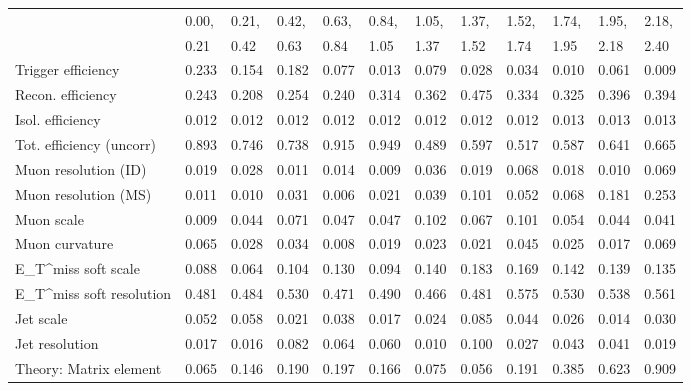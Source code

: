 \begin{tabular}{l|p{0.6cm}p{0.6cm}p{0.6cm}p{0.6cm}p{0.6cm}p{0.6cm}p{0.6cm}p{0.6cm}p{0.6cm}p{0.6cm}p{0.6cm}}
\hline
   & 0.00, & 0.21, & 0.42, & 0.63, & 0.84, & 1.05, & 1.37, & 1.52, & 1.74, & 1.95, & 2.18,  \\ 
   & 0.21 & 0.42 & 0.63 & 0.84 & 1.05 & 1.37 & 1.52 & 1.74 & 1.95 & 2.18 & 2.40  \\ 
\hline
Trigger efficiency                       & 0.233 & 0.154 & 0.182 & 0.077 & 0.013 & 0.079 & 0.028 & 0.034 & 0.010 & 0.061 & 0.009 \\
Recon. efficiency                        & 0.243 & 0.208 & 0.254 & 0.240 & 0.314 & 0.362 & 0.475 & 0.334 & 0.325 & 0.396 & 0.394 \\
Isol. efficiency                         & 0.012 & 0.012 & 0.012 & 0.012 & 0.012 & 0.012 & 0.012 & 0.012 & 0.013 & 0.013 & 0.013 \\
Tot. efficiency (uncorr)                 & 0.893 & 0.746 & 0.738 & 0.915 & 0.949 & 0.489 & 0.597 & 0.517 & 0.587 & 0.641 & 0.665 \\
Muon resolution (ID)                     & 0.019 & 0.028 & 0.011 & 0.014 & 0.009 & 0.036 & 0.019 & 0.068 & 0.018 & 0.010 & 0.069 \\
Muon resolution (MS)                     & 0.011 & 0.010 & 0.031 & 0.006 & 0.021 & 0.039 & 0.101 & 0.052 & 0.068 & 0.181 & 0.253 \\
Muon scale                               & 0.009 & 0.044 & 0.071 & 0.047 & 0.047 & 0.102 & 0.067 & 0.101 & 0.054 & 0.044 & 0.041 \\
Muon curvature                           & 0.065 & 0.028 & 0.034 & 0.008 & 0.019 & 0.023 & 0.021 & 0.045 & 0.025 & 0.017 & 0.069 \\
E_{T}^{miss} soft scale                  & 0.088 & 0.064 & 0.104 & 0.130 & 0.094 & 0.140 & 0.183 & 0.169 & 0.142 & 0.139 & 0.135 \\
E_{T}^{miss} soft resolution             & 0.481 & 0.484 & 0.530 & 0.471 & 0.490 & 0.466 & 0.481 & 0.575 & 0.530 & 0.538 & 0.561 \\
Jet scale                                & 0.052 & 0.058 & 0.021 & 0.038 & 0.017 & 0.024 & 0.085 & 0.044 & 0.026 & 0.014 & 0.030 \\
Jet resolution                           & 0.017 & 0.016 & 0.082 & 0.064 & 0.060 & 0.010 & 0.100 & 0.027 & 0.043 & 0.041 & 0.019 \\
Theory: Matrix element                   & 0.065 & 0.146 & 0.190 & 0.197 & 0.166 & 0.075 & 0.056 & 0.191 & 0.385 & 0.623 & 0.909 \\

\end{tabular}
